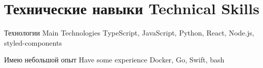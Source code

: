 \section
{\lang
  {Технические навыки}
  {Technical Skills}}

\cvline
{\lang
  {Технологии}
  {Main Technologies}}
{TypeScript, JavaScript, Python, React, Node.js, styled-components}

\cvline
{\lang
  {Имею небольшой опыт}
  {Have some experience}}
{Docker, Go, Swift, bash}
